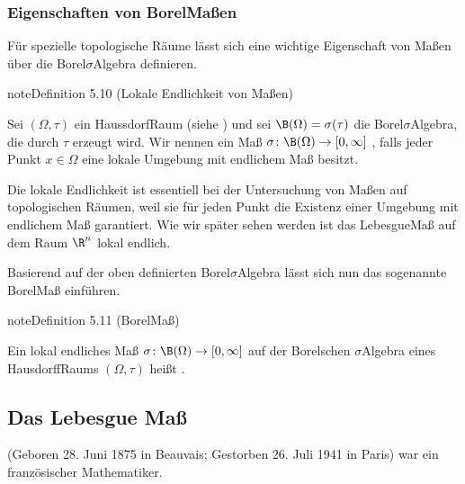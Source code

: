 \documentclass[letterpaper,10pt,german]{jupyterBook}
\begin{document}
\subsubsection{Eigenschaften von Borel\sphinxhyphen{}Maßen}
\label{\detokenize{masstheorie/masstheorie:eigenschaften-von-borel-maszen}}
\sphinxAtStartPar
Für spezielle topologische Räume lässt sich eine wichtige Eigenschaft von Maßen über die Borel\sphinxhyphen{}\(\sigma\)\sphinxhyphen{}Algebra definieren.
\label{masstheorie/masstheorie:definition-19}
\begin{sphinxadmonition}{note}{Definition 5.10 (Lokale Endlichkeit von Maßen)}



\sphinxAtStartPar
Sei \((\Omega, \tau)\) ein Haussdorf\sphinxhyphen{}Raum (siehe {\hyperref[\detokenize{manifolds/manifolds_prelim:def:hausdorffraum}]{}}) und sei \(\B(\Omega) = \sigma(\tau)\) die Borel\sphinxhyphen{}\(\sigma\)\sphinxhyphen{}Algebra, die durch \(\tau\) erzeugt wird.
Wir nennen ein Maß \(\sigma \colon \B(\Omega) \rightarrow [0, \infty]\) , falls jeder Punkt \(x \in \Omega\) eine lokale Umgebung mit endlichem Maß besitzt.
\end{sphinxadmonition}

\sphinxAtStartPar
Die lokale Endlichkeit ist essentiell bei der Untersuchung von Maßen auf topologischen Räumen, weil sie für jeden Punkt die Existenz einer Umgebung mit endlichem Maß garantiert.
Wie wir später sehen werden ist das Lebesgue\sphinxhyphen{}Maß auf dem Raum \(\R^n\) lokal endlich.

\sphinxAtStartPar
Basierend auf der oben definierten Borel\sphinxhyphen{}\(\sigma\)\sphinxhyphen{}Algebra lässt sich nun das sogenannte Borel\sphinxhyphen{}Maß einführen.
\label{masstheorie/masstheorie:definition-20}
\begin{sphinxadmonition}{note}{Definition 5.11 (Borel\sphinxhyphen{}Maß)}



\sphinxAtStartPar
Ein lokal endliches Maß \(\sigma \colon \B(\Omega) \rightarrow [0, \infty]\) auf der Borelschen \(\sigma\)\sphinxhyphen{}Algebra eines Hausdorff\sphinxhyphen{}Raums \((\Omega,\tau)\) heißt .
\end{sphinxadmonition}


\subsection{Das Lebesgue Maß}
\label{\detokenize{masstheorie/masstheorie:das-lebesgue-masz}}\label{\detokenize{masstheorie/masstheorie:s-lebesguemeasure}}
\begin{sphinxShadowBox}

\sphinxAtStartPar
{} (Geboren 28. Juni 1875 in Beauvais; Gestorben 26. Juli 1941 in Paris) war ein französischer Mathematiker.
\end{sphinxShadowBox}
\end{document}
